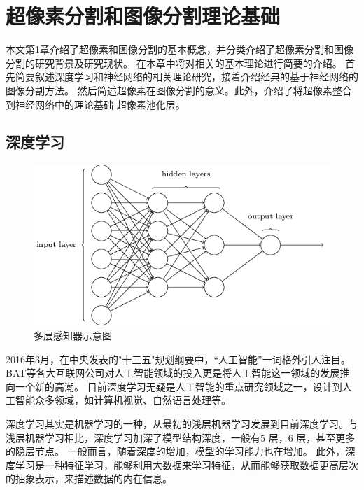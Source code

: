 
\chapter{超像素分割和图像分割理论基础}

本文第1章介绍了超像素和图像分割的基本概念，并分类介绍了超像素分割和图像分割的研究背景及研究现状。
在本章中将对相关的基本理论进行简要的介绍。
首先简要叙述深度学习和神经网络的相关理论研究，接着介绍经典的基于神经网络的图像分割方法。
然后简述超像素在图像分割的意义。此外，介绍了将超像素整合到神经网络中的理论基础-超像素池化层。

\section{深度学习}
\begin{figure}[h]
\begin{center}
\includegraphics[width=1\textwidth]{figures/CNN0.png}
\end{center}
\vspace{-5mm}
\caption{多层感知器示意图}
\end{figure}
2016年3月，在中央发表的"十三五"规划纲要中，“人工智能”一词格外引人注目。
BAT等各大互联网公司对人工智能领域的投入更是将人工智能这一领域的发展推向一个新的高潮。
目前深度学习无疑是人工智能的重点研究领域之一，设计到人工智能众多领域，如计算机视觉、自然语言处理等。

深度学习其实是机器学习的一种，从最初的浅层机器学习发展到目前深度学习。与浅层机器学习相比，深度学习加深了模型结构深度，一般有5 层，6 层，甚至更多的隐层节点。
一般而言，随着深度的增加，模型的学习能力也在增加。
此外，深度学习是一种特征学习，能够利用大数据来学习特征，从而能够获取数据更高层次的抽象表示，来描述数据的内在信息。

